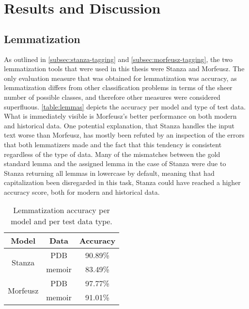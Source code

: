 \section{Results and Discussion}
\label{sec:results}

\subsection{Lemmatization}
\label{subsec:lemmatization}

As outlined in \autoref{subsec:stanza-tagging} and \autoref{subsec:morfeusz-tagging}, the two lemmatization tools that were used in this thesis were Stanza and Morfeusz. The only evaluation measure that was obtained for lemmatization was accuracy, as lemmatization differs from other classification problems in terms of the sheer number of possible classes, and therefore other measures were considered superfluous. \autoref{table:lemmas} depicts the accuracy per model and type of test data. What is immediately visible is Morfeusz's better performance on both modern and historical data. One potential explanation, that Stanza handles the input text worse than Morfeusz, has mostly been refuted by an inspection of the errors that both lemmatizers made and the fact that this tendency is consistent regardless of the type of data. Many of the mismatches between the gold standard lemma and the assigned lemma in the case of Stanza were due to Stanza returning all lemmas in lowercase by default, meaning that had capitalization been disregarded in this task, Stanza could have reached a higher accuracy score, both for modern and historical data.  \\

\renewcommand{\arraystretch}{1.25}
\begin{table}[h]
\begin{center}
\begin{tabular}{|cc|c|}
\hline \bf Model & \bf Data & \bf Accuracy \\ \hline
\multirow{2}{4em}{Stanza}
& PDB & 90.89\%  \\
& memoir & 83.49\%  \\
\multirow{2}{4em}{Morfeusz}
& PDB & 97.77\%  \\
& memoir & 91.01\% \\ 
\hline
\end{tabular}
\caption{\label{table:lemmas} Lemmatization accuracy per model and per test data type.}
\end{center}
\end{table}

